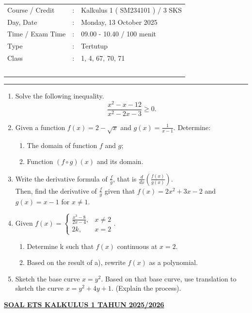 \documentclass[10pt,openany,a4paper]{article}
\theoremstyle{definition}
\theoremstyle{definition}
\theoremstyle{plain}
\begin{document}
    \begin{center}
	\begin{tabular}{lcl}
		Course / Credit & : & Kalkulus 1 ( SM234101 ) / 3 SKS\\
		Day, Date & : & Monday, 13 October 2025\\
		Time / Exam Time & : & 09.00 - 10.40 / 100 menit\\
		Type & : & Tertutup\\
		Class & : & 1, 4, 67, 70, 71\\
  ~
	\end{tabular}
    
    \noindent\rule{\textwidth}{2.pt}
        \end{center}
\begin{enumerate}
           \item Solve the following inequality.
    \[ \frac{x^2 - x - 12}{x^2 - 2x - 3} \ge 0. \]

    \item Given a function \(f(x) = 2 - \sqrt{x}\) and \(g(x) = \frac{1}{x-1}\). Determine:
    \begin{enumerate}
        \item[a)] The domain of function \(f\) and \(g\);
        \item[b)] Function \((f \circ g)(x)\) and its domain.
    \end{enumerate}

    \item Write the derivative formula of \(\frac{f}{g}\), that is \(\frac{d}{dx}\left(\frac{f(x)}{g(x)}\right)\). \\
    Then, find the derivative of \(\frac{f}{g}\) given that \(f(x) = 2x^2 + 3x - 2\) and \(g(x) = x - 1\) for \(x \neq 1\).

    \item Given \(f(x) = \begin{cases} \frac{x^3-8}{2x-4}, & x \neq 2 \\ 2k, & x=2 \end{cases}\).
    \begin{enumerate}
        \item[a.] Determine k such that \(f(x)\) continuous at \(x = 2\).
        \item[b.] Based on the result of a), rewrite \(f(x)\) as a polynomial.
    \end{enumerate}

    \item Sketch the base curve \(x = y^2\). Based on that base curve, use translation to sketch the curve \(x = y^2 + 4y + 1\). (Explain the process).

        \end{enumerate}
               \newpage
 \begin{center}
	{\underline{\textbf{\MakeUppercase{Soal ETS Kalkulus 1 Tahun 2025/2026}}}}
    \end{center}
\end{document}
